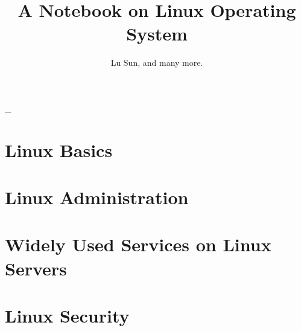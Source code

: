 

\makeindex



\frontmatter

\title{A Notebook on Linux Operating System}
\author{Lu Sun, and many more.}

\maketitle


\tableofcontents


\listoffigures
\listoftables

\mainmatter\_

\part{Linux Basics}







\part{Linux Administration}




\part{Widely Used Services on Linux Servers}
 









\part{Linux Security}



\appendix








\printindex


